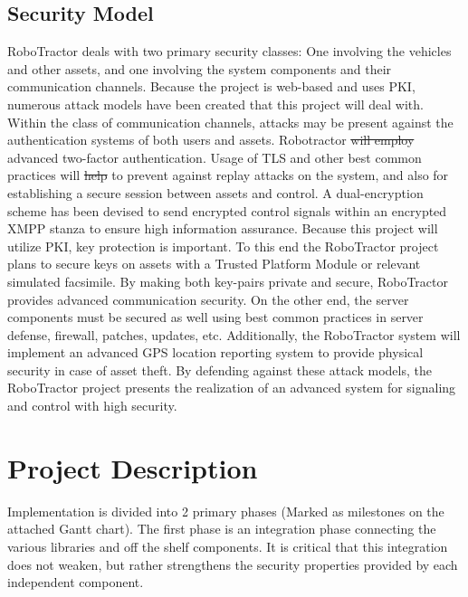 \documentclass[conference,12pt]{IEEEtran}
\providecommand{\DIFaddtex}[1]{{\protect\color{blue}\uwave{#1}}} %
\providecommand{\DIFdeltex}[1]{{\protect\color{red}\sout{#1}}}                      %
\providecommand{\DIFaddbegin}{} %
\providecommand{\DIFaddend}{} %
\providecommand{\DIFdelbegin}{} %
\providecommand{\DIFdelend}{} %
\providecommand{\DIFadd}[1]{\texorpdfstring{\DIFaddtex{#1}}{#1}} %
\providecommand{\DIFdel}[1]{\texorpdfstring{\DIFdeltex{#1}}{}} %
\begin{document}
\subsection{Security Model}
RoboTractor deals with two primary security classes: One involving the vehicles
and other assets, and one involving the system components and their communication channels.
Because the project is web-based and uses PKI, numerous attack models have
been created that this project will deal with. Within the class of communication channels,
attacks may be present against the authentication systems of both users and assets. Robotractor \DIFdelbegin \DIFdel{will employ
}\DIFdelend \DIFaddbegin \DIFadd{currently employs
}\DIFaddend advanced two-factor authentication. Usage of TLS and other best common practices will \DIFdelbegin \DIFdel{help }\DIFdelend \DIFaddbegin \DIFadd{be implemented }\DIFaddend to prevent
against replay attacks on the system, and also for establishing a secure session between assets and control.
A dual-encryption scheme has been devised to send encrypted control signals within an encrypted XMPP stanza
to ensure high information assurance. Because this project will utilize PKI, key protection is important. To this end
the RoboTractor project plans to secure keys on assets with a Trusted Platform Module or relevant simulated facsimile.
By making both key-pairs private and secure, RoboTractor provides advanced communication security.
On the other end, the server components must be secured as well using best common practices in server defense, firewall,
patches, updates, etc. Additionally, the RoboTractor system will implement an advanced GPS location reporting system
to provide physical security in case of asset theft. By defending against these attack models, the RoboTractor project
presents the realization of an advanced system for signaling and control with high security. 

\section{Project Description}
Implementation is divided into 2 primary phases (Marked as milestones on the
attached Gantt chart).  The first phase is an integration phase connecting
the various libraries and off the shelf components. It is critical that this
integration does not weaken, but rather strengthens the security properties
provided by each independent component. 
\end{document}
